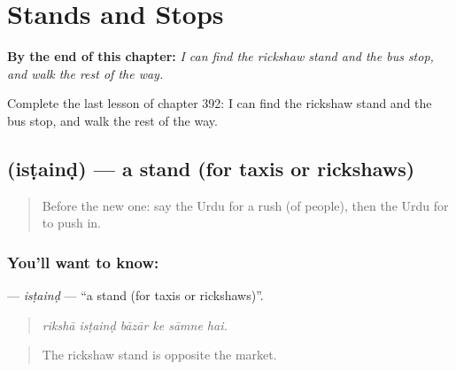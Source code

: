 
\chapter{Stands and Stops}
\label{ch:ur-stands-and-stops}

\begin{chapteropening}
\textbf{By the end of this chapter:} \emph{I can find the rickshaw stand and the bus stop, and walk the rest of the way.}

Complete the last lesson of chapter 392: I can find the rickshaw stand and the bus stop, and walk the rest of the way.
\end{chapteropening}

\section[\texorpdfstring{\ur{اسٹینڈ} (isṭainḍ)}{اسٹینڈ (isṭainḍ)}]{ (isṭainḍ) — a stand (for taxis or rickshaws)}

\label{lesson:UR-C392-istaind}



\begin{quote}
Before the new one: say the Urdu for a rush (of people), then the Urdu for to push in.
\end{quote}

\subsection*{You'll want to know: }
\textbf{} — \emph{isṭainḍ} — \textquotedblleft{}a stand (for taxis or rickshaws)\textquotedblright{}.

\begin{quote}
     
\end{quote}

\begin{quote}
\emph{rikshā isṭainḍ bāzār ke sāmne hai.}
\end{quote}

\begin{quote}
The rickshaw stand is opposite the market.
\end{quote}

